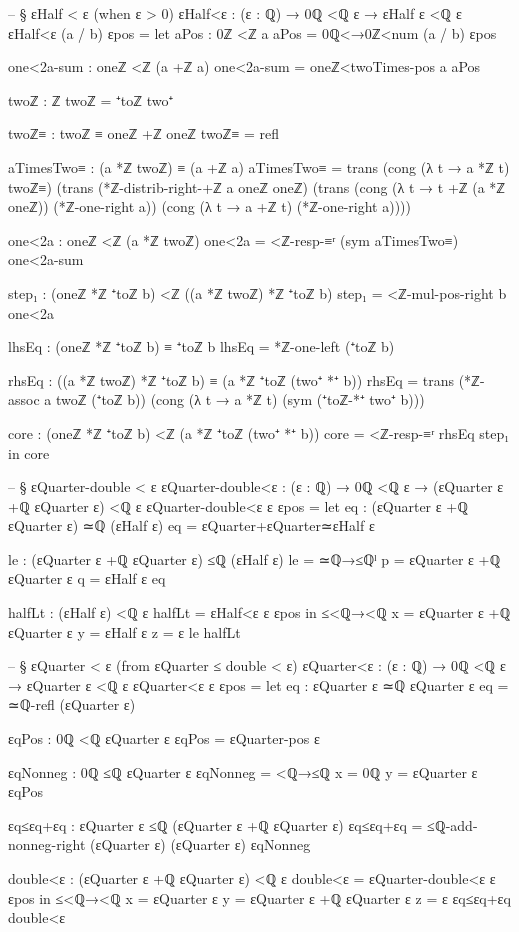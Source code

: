 \documentclass[11pt,a4paper]{book}
\begin{document}
\begin{code}
-- § εHalf < ε (when ε > 0)
εHalf<ε : (ε : ℚ) → 0ℚ <ℚ ε → εHalf ε <ℚ ε
εHalf<ε (a / b) εpos =
  let
    aPos : 0ℤ <ℤ a
    aPos = 0ℚ<→0ℤ<num (a / b) εpos

    one<2a-sum : oneℤ <ℤ (a +ℤ a)
    one<2a-sum = oneℤ<twoTimes-pos a aPos

    twoℤ : ℤ
    twoℤ = ⁺toℤ two⁺

    twoℤ≡ : twoℤ ≡ oneℤ +ℤ oneℤ
    twoℤ≡ = refl

    aTimesTwo≡ : (a *ℤ twoℤ) ≡ (a +ℤ a)
    aTimesTwo≡ =
      trans
        (cong (λ t → a *ℤ t) twoℤ≡)
        (trans
          (*ℤ-distrib-right-+ℤ a oneℤ oneℤ)
          (trans
            (cong (λ t → t +ℤ (a *ℤ oneℤ)) (*ℤ-one-right a))
            (cong (λ t → a +ℤ t) (*ℤ-one-right a))))

    one<2a : oneℤ <ℤ (a *ℤ twoℤ)
    one<2a = <ℤ-resp-≡ʳ (sym aTimesTwo≡) one<2a-sum

    step₁ : (oneℤ *ℤ ⁺toℤ b) <ℤ ((a *ℤ twoℤ) *ℤ ⁺toℤ b)
    step₁ = <ℤ-mul-pos-right b one<2a

    lhsEq : (oneℤ *ℤ ⁺toℤ b) ≡ ⁺toℤ b
    lhsEq = *ℤ-one-left (⁺toℤ b)

    rhsEq : ((a *ℤ twoℤ) *ℤ ⁺toℤ b) ≡ (a *ℤ ⁺toℤ (two⁺ *⁺ b))
    rhsEq =
      trans
        (*ℤ-assoc a twoℤ (⁺toℤ b))
        (cong (λ t → a *ℤ t) (sym (⁺toℤ-*⁺ two⁺ b)))

    core : (oneℤ *ℤ ⁺toℤ b) <ℤ (a *ℤ ⁺toℤ (two⁺ *⁺ b))
    core = <ℤ-resp-≡ʳ rhsEq step₁
  in
  core

-- § εQuarter-double < ε
εQuarter-double<ε : (ε : ℚ) → 0ℚ <ℚ ε → (εQuarter ε +ℚ εQuarter ε) <ℚ ε
εQuarter-double<ε ε εpos =
  let
    eq : (εQuarter ε +ℚ εQuarter ε) ≃ℚ (εHalf ε)
    eq = εQuarter+εQuarter≃εHalf ε

    le : (εQuarter ε +ℚ εQuarter ε) ≤ℚ (εHalf ε)
    le = ≃ℚ→≤ℚˡ {p = εQuarter ε +ℚ εQuarter ε} {q = εHalf ε} eq

    halfLt : (εHalf ε) <ℚ ε
    halfLt = εHalf<ε ε εpos
  in
  ≤<ℚ→<ℚ {x = εQuarter ε +ℚ εQuarter ε} {y = εHalf ε} {z = ε} le halfLt

-- § εQuarter < ε (from εQuarter ≤ double < ε)
εQuarter<ε : (ε : ℚ) → 0ℚ <ℚ ε → εQuarter ε <ℚ ε
εQuarter<ε ε εpos =
  let
    eq : εQuarter ε ≃ℚ εQuarter ε
    eq = ≃ℚ-refl (εQuarter ε)

    εqPos : 0ℚ <ℚ εQuarter ε
    εqPos = εQuarter-pos ε

    εqNonneg : 0ℚ ≤ℚ εQuarter ε
    εqNonneg = <ℚ→≤ℚ {x = 0ℚ} {y = εQuarter ε} εqPos

    εq≤εq+εq : εQuarter ε ≤ℚ (εQuarter ε +ℚ εQuarter ε)
    εq≤εq+εq = ≤ℚ-add-nonneg-right (εQuarter ε) (εQuarter ε) εqNonneg

    double<ε : (εQuarter ε +ℚ εQuarter ε) <ℚ ε
    double<ε = εQuarter-double<ε ε εpos
  in
  ≤<ℚ→<ℚ {x = εQuarter ε} {y = εQuarter ε +ℚ εQuarter ε} {z = ε} εq≤εq+εq double<ε
\end{code}
\end{document}
